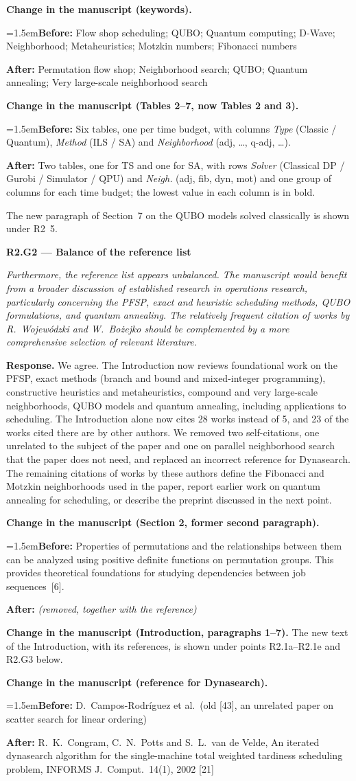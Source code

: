 \documentclass[12pt]{article}
\newenvironment{rc}[1]{\par\medskip\noindent\textbf{#1}\par\nopagebreak\noindent\itshape\renewcommand{\emph}[1]{\textbf{##1}}\ignorespaces}{\par}
\newcommand{\answer}[1]{\par\smallskip\noindent\textbf{Response.} #1\par}
\newcommand{\change}[3]{\par\smallskip\noindent\textbf{Change in the manuscript (#1).}\par
  {\leftskip=1.5em\noindent\textbf{Before:} #2\par\noindent\textbf{After:} #3\par}}
\begin{document}
\change{keywords}{Flow shop scheduling; QUBO; Quantum computing; D-Wave; Neighborhood; Metaheuristics; Motzkin numbers; Fibonacci numbers}{Permutation flow shop; Neighborhood search; QUBO; Quantum annealing; Very large-scale neighborhood search}
\change{Tables 2--7, now Tables 2 and 3}{Six tables, one per time budget, with columns \textit{Type} (Classic / Quantum), \textit{Method} (ILS / SA) and \textit{Neighborhood} (adj, \dots, q-adj, \dots).}{Two tables, one for TS and one for SA, with rows \textit{Solver} (Classical DP / Gurobi / Simulator / QPU) and \textit{Neigh.} (adj, fib, dyn, mot) and one group of columns for each time budget; the lowest value in each column is in bold.}
The new paragraph of Section~7 on the QUBO models solved classically is shown under R2~5.
\medskip

\begin{rc}{R2.G2 --- Balance of the reference list}
Furthermore, the reference list appears unbalanced. The manuscript would benefit from a broader discussion of established research in operations research, particularly concerning the PFSP, exact and heuristic scheduling methods, QUBO formulations, and quantum annealing. The relatively frequent citation of works by R.~Wojewódzki and W.~Bożejko should be complemented by a more comprehensive selection of relevant literature.
\end{rc}
\answer{We agree. The Introduction now reviews foundational work on the PFSP, exact methods (branch and bound and mixed-integer programming), constructive heuristics and metaheuristics, compound and very large-scale neighborhoods, QUBO models and quantum annealing, including applications to scheduling. The Introduction alone now cites 28 works instead of 5, and 23 of the works cited there are by other authors. We removed two self-citations, one unrelated to the subject of the paper and one on parallel neighborhood search that the paper does not need, and replaced an incorrect reference for Dynasearch. The remaining citations of works by these authors define the Fibonacci and Motzkin neighborhoods used in the paper, report earlier work on quantum annealing for scheduling, or describe the preprint discussed in the next point.}
\change{Section 2, former second paragraph}{Properties of permutations and the relationships between them can be analyzed using positive definite functions on permutation groups. This provides theoretical foundations for studying dependencies between job sequences~[6].}{\textit{(removed, together with the reference)}}
\par\smallskip\noindent\textbf{Change in the manuscript (Introduction, paragraphs 1--7).} The new text of the Introduction, with its references, is shown under points R2.1a--R2.1e and R2.G3 below.\par
\change{reference for Dynasearch}{D.~Campos-Rodr\'iguez et al.\ (old [43], an unrelated paper on scatter search for linear ordering)}{R.~K.~Congram, C.~N.~Potts and S.~L.~van de Velde, An iterated dynasearch algorithm for the single-machine total weighted tardiness scheduling problem, INFORMS J.\ Comput.\ 14(1), 2002 [21]}
\end{document}
